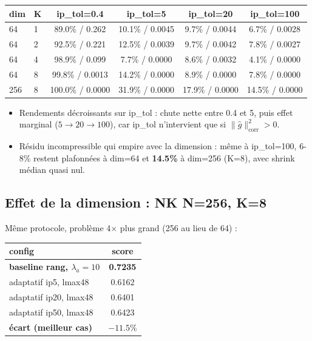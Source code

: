 \documentclass{article}
\begin{document}
\begin{center}
\begin{tabular}{@{}llcccc@{}}
\toprule
dim & K & ip\_tol=0.4 & ip\_tol=5 & ip\_tol=20 & ip\_tol=100 \\
\midrule
64  & 1 & 89.0\% / 0.262   & 10.1\% / 0.0045 & 9.7\% / 0.0044  & 6.7\% / 0.0028 \\
64  & 2 & 92.5\% / 0.221   & 12.5\% / 0.0039 & 9.7\% / 0.0042  & 7.8\% / 0.0027 \\
64  & 4 & 98.9\% / 0.099   & 7.7\% / 0.0000  & 8.6\% / 0.0032  & 4.1\% / 0.0000 \\
64  & 8 & 99.8\% / 0.0013  & 14.2\% / 0.0000 & 8.9\% / 0.0000  & 7.8\% / 0.0000 \\
256 & 8 & 100.0\% / 0.0000 & 31.9\% / 0.0000 & 17.9\% / 0.0000 & 14.5\% / 0.0000 \\
\bottomrule
\end{tabular}
\end{center}

\begin{itemize}
  \item Rendements décroissants sur ip\_tol : chute nette entre 0.4 et 5, puis effet marginal
    ($5\to20\to100$), car ip\_tol n'intervient que si $\|\hat g\|^2_{\mathrm{corr}}>0$.
  \item Résidu incompressible qui empire avec la dimension : même à ip\_tol=100, 6-8\% restent
    plafonnées à dim=64 et \textbf{14.5\%} à dim=256 (K=8), avec shrink médian quasi nul.
\end{itemize}

\subsection{Effet de la dimension : NK N=256, K=8}

Même protocole, problème 4$\times$ plus grand (256 au lieu de 64) :

\begin{center}
\begin{tabular}{@{}lc@{}}
\toprule
config & score \\
\midrule
\textbf{baseline rang, $\lambda_a=10$} & \textbf{0.7235} \\
adaptatif ip5, lmax48  & 0.6162 \\
adaptatif ip20, lmax48 & 0.6401 \\
adaptatif ip50, lmax48 & 0.6423 \\
\textbf{écart (meilleur cas)} & \textbf{$-11.5\%$} \\
\bottomrule
\end{tabular}
\end{center}
\end{document}
